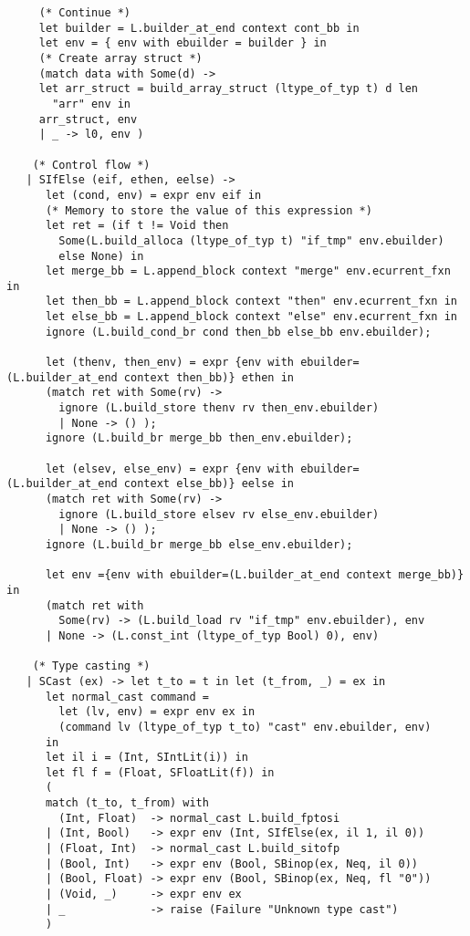 \documentclass[main.tex]{subfiles}
\begin{document}
\begin{lstlisting}
     (* Continue *)
     let builder = L.builder_at_end context cont_bb in
     let env = { env with ebuilder = builder } in
     (* Create array struct *)
     (match data with Some(d) ->
     let arr_struct = build_array_struct (ltype_of_typ t) d len
       "arr" env in
     arr_struct, env
     | _ -> l0, env )

    (* Control flow *)
   | SIfElse (eif, ethen, eelse) ->
      let (cond, env) = expr env eif in
      (* Memory to store the value of this expression *)
      let ret = (if t != Void then
        Some(L.build_alloca (ltype_of_typ t) "if_tmp" env.ebuilder)
        else None) in
      let merge_bb = L.append_block context "merge" env.ecurrent_fxn in
      let then_bb = L.append_block context "then" env.ecurrent_fxn in
      let else_bb = L.append_block context "else" env.ecurrent_fxn in
      ignore (L.build_cond_br cond then_bb else_bb env.ebuilder);

      let (thenv, then_env) = expr {env with ebuilder=(L.builder_at_end context then_bb)} ethen in
      (match ret with Some(rv) ->
        ignore (L.build_store thenv rv then_env.ebuilder)
        | None -> () );
      ignore (L.build_br merge_bb then_env.ebuilder);

      let (elsev, else_env) = expr {env with ebuilder=(L.builder_at_end context else_bb)} eelse in
      (match ret with Some(rv) ->
        ignore (L.build_store elsev rv else_env.ebuilder)
        | None -> () );
      ignore (L.build_br merge_bb else_env.ebuilder);

      let env ={env with ebuilder=(L.builder_at_end context merge_bb)} in
      (match ret with
        Some(rv) -> (L.build_load rv "if_tmp" env.ebuilder), env
      | None -> (L.const_int (ltype_of_typ Bool) 0), env)

    (* Type casting *)
   | SCast (ex) -> let t_to = t in let (t_from, _) = ex in 
      let normal_cast command = 
        let (lv, env) = expr env ex in
        (command lv (ltype_of_typ t_to) "cast" env.ebuilder, env)
      in
      let il i = (Int, SIntLit(i)) in
      let fl f = (Float, SFloatLit(f)) in
      (
      match (t_to, t_from) with
        (Int, Float)  -> normal_cast L.build_fptosi 
      | (Int, Bool)   -> expr env (Int, SIfElse(ex, il 1, il 0))
      | (Float, Int)  -> normal_cast L.build_sitofp
      | (Bool, Int)   -> expr env (Bool, SBinop(ex, Neq, il 0))
      | (Bool, Float) -> expr env (Bool, SBinop(ex, Neq, fl "0"))
      | (Void, _)     -> expr env ex
      | _             -> raise (Failure "Unknown type cast")
      )
   

\end{lstlisting}
\end{document}
